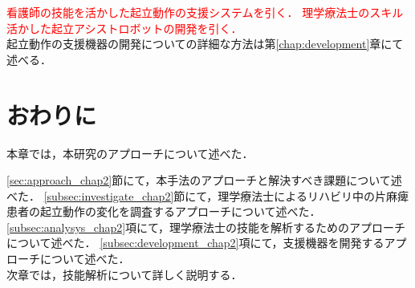 \textcolor{red}{看護師の技能を活かした起立動作の支援システムを引く\cite{Chugo2007}．
	理学療法士のスキル活かした起立アシストロボットの開発を引く\cite{津坂2017}．
}\\



起立動作の支援機器の開発についての詳細な方法は第\ref{chap:development}章にて述べる．

\clearpage

\section{おわりに}
\label{sec:outro_chap2}

本章では，本研究のアプローチについて述べた．


\ref{sec:approach_chap2}節にて，本手法のアプローチと解決すべき課題について述べた．
\ref{subsec:investigate_chap2}節にて，理学療法士によるリハビリ中の片麻痺患者の起立動作の変化を調査するアプローチについて述べた．
\ref{subsec:analysys_chap2}項にて，理学療法士の技能を解析するためのアプローチについて述べた．
\ref{subsec:development_chap2}項にて，支援機器を開発するアプローチについて述べた．\\

次章では，技能解析について詳しく説明する．

\clearpage

